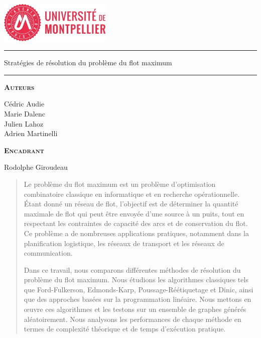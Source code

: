 \documentclass[a4paper]{article}
\begin{document}
\begin{center}
\vspace{2cm}
\includegraphics[width=0.4\textwidth]{UM1.jpg}~\\[1cm]
\vspace{2cm}

\hrule
\vspace{.5cm}
{\huge\bfseries{Stratégies de résolution du problème du flot maximum\par}} %
\vspace{.5cm}

\hrule
\vspace{1.5cm}

\textsc{\textbf{Auteurs}}\\
\vspace{.5cm}
\centering

Cédric Audie\\
Marie Dalenc\\
Julien Lahoz\\
Adrien Martinelli


\vspace{1cm}

\textsc{\textbf{Encadrant}}\\
\vspace{.5cm}
\centering

Rodolphe Giroudeau

\vspace{4cm}

\centering {} %
\end{center}
\newpage
\begin{abstract}	
Le problème du flot maximum est un problème d'optimisation combinatoire classique en informatique et en recherche opérationnelle. Étant donné un réseau de flot, l'objectif est de déterminer la quantité maximale de flot qui peut être envoyée d'une source à un puits, tout en respectant les contraintes de capacité des arcs et de conservation du flot. Ce problème a de nombreuses applications pratiques, notamment dans la planification logistique, les réseaux de transport et les réseaux de communication. 

Dans ce travail, nous comparons différentes méthodes de résolution du problème du flot maximum.  Nous étudions les algorithmes classiques tels que Ford-Fulkerson, Edmonds-Karp, Poussage-Réétiquetage et Dinic, ainsi que des approches basées sur la programmation linéaire. Nous mettons en œuvre ces algorithmes et les testons sur un ensemble de graphes générés aléatoirement. Nous analysons les performances de chaque méthode en termes de complexité théorique et de temps d'exécution pratique. 
\end{abstract}
\newpage
{\hypersetup{hidelinks}
\tableofcontents
}
\newpage
\pagestyle{headings}
\end{document}
